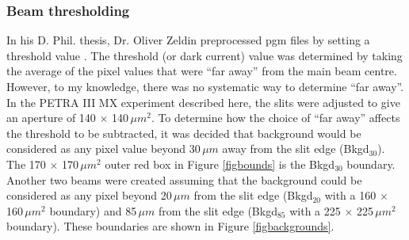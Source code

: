 \subsubsection{Beam thresholding}
\label{secthresh}
In his D. Phil. thesis, Dr. Oliver Zeldin preprocessed pgm files by setting a threshold value \cite{zeldin2013thesis}.
The threshold (or dark current) value was determined by taking the average of the pixel values that were ``far away'' from the main beam centre.
However, to my knowledge, there was no systematic way to determine ``far away''.
In the PETRA III MX experiment described here, the slits were adjusted to give an aperture of 140 $\times$ 140$\, \mu m^{\text{2}}$.
To determine how the choice of ``far away'' affects the threshold to be subtracted, it was decided that background would be considered as any pixel value beyond 30$\,\mu m$ away from the slit edge (Bkgd$_{\text{30}}$).
The 170 $\times$ 170$\, \mu m^{\text{2}}$ outer red box in Figure \ref{figbounds} is the Bkgd$_{\text{30}}$ boundary.
Another two beams were created assuming that the background could be considered as any pixel beyond 20$\,\mu m$ from the slit edge (Bkgd$_{\text{20}}$ with a 160 $\times$ 160$\, \mu m^{\text{2}}$ boundary) and 85$\,\mu m$ from the slit edge (Bkgd$_{\text{85}}$ with a 225 $\times$ 225$\, \mu m^{\text{2}}$ boundary).
These boundaries are shown in Figure \ref{figbackgrounds}.
